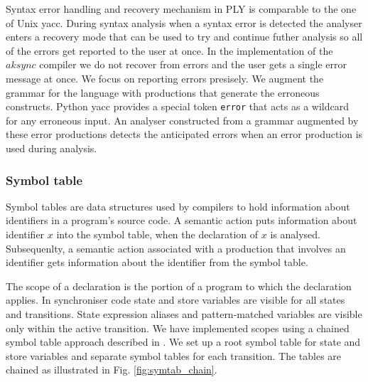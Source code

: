 Syntax error handling and recovery mechanism in PLY is comparable to the one of Unix yacc. During syntax analysis when a syntax error is detected the analyser enters a recovery mode that can be used to try and continue futher analysis so all of the errors get reported to the user at once. In the implementation of the $aksync$ compiler we do not recover from errors and the user gets a single error message at once. We focus on reporting errors presisely. We augment the grammar for the language with productions that generate the erroneous constructs. Python yacc provides a special token \texttt{error} that acts as a wildcard for any erroneous input. An analyser constructed from a grammar augmented by these error productions detects the anticipated errors when an error production is used during analysis.




  \subsubsection{Symbol table}
Symbol tables are data structures used by compilers to hold information about identifiers in a program's source code. A semantic action puts information about identifier $x$ into the symbol table, when the declaration of $x$ is analysed. Subsequenlty, a semantic action associated with a production that involves an identifier gets information about the identifier from the symbol table.

The scope of a declaration is the portion of a program to which the declaration applies. In synchroniser code state and store variables are visible for all states and transitions. State expression aliases and pattern-matched variables are visible only within the active transition. We have implemented scopes using a chained symbol table approach described in \cite{dragonbook}. We set up a root symbol table for state and store variables and separate symbol tables for each transition. The tables are chained as illustrated in Fig. \ref{fig:symtab_chain}.

